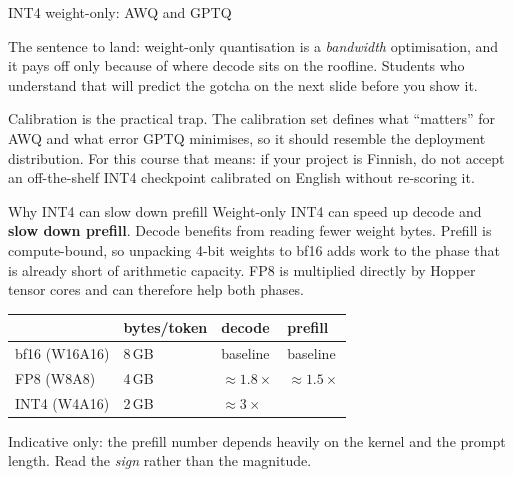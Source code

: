 \documentclass[aspectratio=169,10pt]{beamer}
\begin{document}
\begin{frame}[shrink=3]{INT4 weight-only: AWQ and GPTQ}
{  The sentence to land: weight-only quantisation is a \emph{bandwidth}
  optimisation, and it pays off only because of where decode sits on the
  roofline. Students who understand that will predict the gotcha on the next
  slide before you show it.

  Calibration is the practical trap. The calibration set defines what ``matters''
  for AWQ and what error GPTQ minimises, so it should resemble the deployment
  distribution. For this course that means: if your project is Finnish, do not
  accept an off-the-shelf INT4 checkpoint calibrated on English without
  re-scoring it.}
\end{frame}

\begin{frame}{Why INT4 can slow down prefill}
  Weight-only INT4 can speed up decode and \textbf{slow down prefill}.
  Decode benefits from reading fewer weight bytes. Prefill is compute-bound,
  so unpacking 4-bit weights to bf16 adds work to the phase that is already
  short of arithmetic capacity. FP8 is multiplied directly by Hopper tensor
  cores and can therefore help both phases.
  \vspace{0.4em}
  \centering
  \begin{tabular}{@{}L{3.4cm} C{2.6cm} C{2.6cm} C{2.2cm}@{}}
    \toprule
    & \textbf{bytes/token} & \textbf{decode} & \textbf{prefill}\\
    \midrule
    bf16 (W16A16) & 8\,GB & baseline & baseline\\
    FP8 (W8A8)    & 4\,GB & $\approx 1.8\times$ & $\approx 1.5\times$\\
    INT4 (W4A16)  & 2\,GB & $\approx 3\times$ & \\
    \bottomrule
  \end{tabular}

  \vspace{0.3em}
  \raggedright\small
  Indicative only: the prefill number depends heavily on the kernel and the
  prompt length. Read the \emph{sign} rather than the magnitude.
\end{frame}
\end{document}
